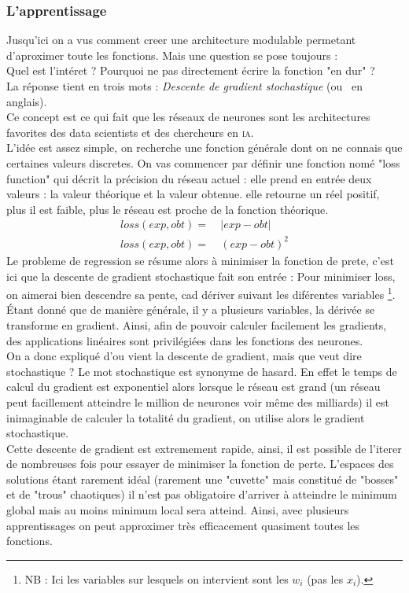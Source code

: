 \subsubsection{L'apprentissage}
Jusqu'ici on a vus comment creer une architecture modulable permetant d'aproximer toute les fonctions.
Mais une question se pose toujours :\\
Quel est l'intéret ?
Pourquoi ne pas directement écrire la fonction "en dur" ?\\
La réponse tient en trois mots : \textit{Descente de gradient stochastique} (ou  \sgd\ en anglais). \\
Ce concept est ce qui fait que les réseaux de neurones sont les architectures favorites
des data scientists et des chercheurs en \textsc{ia}.\\


L'idée est assez simple, on recherche une fonction générale dont on ne connais que certaines valeurs discretes.
On vas commencer par définir une fonction nomé "loss function"
qui décrit la précision du réseau actuel :
elle prend en entrée deux valeurs : la valeur théorique et la valeur obtenue.
elle retourne un réel positif, plus il est faible, plus le réseau est proche de la fonction théorique.
\exemle
{
\begin{align*}
    loss(exp, obt) = &\ |exp - obt| \\
    loss(exp, obt) = &\ (exp - obt)^2
\end{align*}
}
Le probleme de regression se résume alors à minimiser la fonction de prete,
c'est ici que la descente de gradient stochastique fait son entrée :
Pour minimiser loss, on aimerai bien descendre sa pente, cad dériver suivant les diférentes variables
\footnote{\textsc{NB :} Ici les variables sur lesquels on intervient sont les $w_i$ (pas les $x_i$).}.
Étant donné que de manière générale, il y a plusieurs variables, la dérivée se transforme en gradient.
Ainsi, afin de pouvoir calculer facilement les gradients,
des applications linéaires sont privilégiées dans les fonctions des neurones.\\


On a donc expliqué d'ou vient la descente de gradient, mais que veut dire stochastique ?
Le mot stochastique est synonyme de hasard.
En effet le temps de calcul du gradient est exponentiel
alors lorsque le réseau est grand
(un réseau peut facillement atteindre le million de neurones voir même des milliards\cite{i3espectrum})
il est inimaginable de calculer la totalité du gradient, on utilise alors le gradient stochastique.\\


Cette descente de gradient est extremement rapide, ainsi, il est possible de l'iterer de nombreuses fois
pour essayer de minimiser la fonction de perte.
L'espaces des solutions étant rarement idéal
(rarement une "cuvette" mais constitué de "bosses" et de "trous" chaotiques)
il n'est pas obligatoire d'arriver à atteindre le minimum global mais au moins minimum local sera atteind.
Ainsi, avec plusieurs apprentissages on peut approximer très efficacement quasiment toutes les fonctions.
